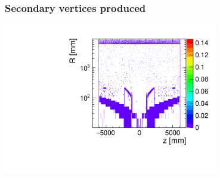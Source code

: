 \documentclass[aspectratio=169, hyperref={colorlinks=true,pdfpagelabels=false,linkcolor=black}, xcolor=dvipsnames,10pt]{beamer}
\begin{document}
\begin{frame}
	\frametitle{Secondary vertices produced}


	\centering
	\includegraphics[width=0.7\textwidth]{../figures/SecondaryVertices_logScale.pdf}

	
\end{frame}


\end{document}
